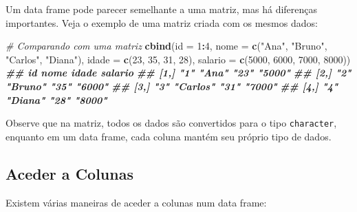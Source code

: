 \documentclass[
]{book}
\newenvironment{Shaded}{\begin{snugshade}}{\end{snugshade}}
\newcommand{\AttributeTok}[1]{\textcolor[rgb]{0.13,0.29,0.53}{#1}}
\newcommand{\CommentTok}[1]{\textcolor[rgb]{0.56,0.35,0.01}{\textit{#1}}}
\newcommand{\DecValTok}[1]{\textcolor[rgb]{0.00,0.00,0.81}{#1}}
\newcommand{\DocumentationTok}[1]{\textcolor[rgb]{0.56,0.35,0.01}{\textbf{\textit{#1}}}}
\newcommand{\FunctionTok}[1]{\textcolor[rgb]{0.13,0.29,0.53}{\textbf{#1}}}
\newcommand{\NormalTok}[1]{#1}
\newcommand{\SpecialCharTok}[1]{\textcolor[rgb]{0.81,0.36,0.00}{\textbf{#1}}}
\newcommand{\StringTok}[1]{\textcolor[rgb]{0.31,0.60,0.02}{#1}}
\begin{document}
Um data frame pode parecer semelhante a uma matriz, mas há diferenças
importantes. Veja o exemplo de uma matriz criada com os mesmos dados:

\begin{Shaded}
\begin{Highlighting}[]
\CommentTok{\# Comparando com uma matriz}
\FunctionTok{cbind}\NormalTok{(}\AttributeTok{id =} \DecValTok{1}\SpecialCharTok{:}\DecValTok{4}\NormalTok{,}
\AttributeTok{nome =} \FunctionTok{c}\NormalTok{(}\StringTok{"Ana"}\NormalTok{, }\StringTok{"Bruno"}\NormalTok{, }\StringTok{"Carlos"}\NormalTok{, }\StringTok{"Diana"}\NormalTok{),}
\AttributeTok{idade =} \FunctionTok{c}\NormalTok{(}\DecValTok{23}\NormalTok{, }\DecValTok{35}\NormalTok{, }\DecValTok{31}\NormalTok{, }\DecValTok{28}\NormalTok{),}
\AttributeTok{salario =} \FunctionTok{c}\NormalTok{(}\DecValTok{5000}\NormalTok{, }\DecValTok{6000}\NormalTok{, }\DecValTok{7000}\NormalTok{, }\DecValTok{8000}\NormalTok{))}
\DocumentationTok{\#\#      id  nome     idade salario}
\DocumentationTok{\#\# [1,] "1" "Ana"    "23"  "5000" }
\DocumentationTok{\#\# [2,] "2" "Bruno"  "35"  "6000" }
\DocumentationTok{\#\# [3,] "3" "Carlos" "31"  "7000" }
\DocumentationTok{\#\# [4,] "4" "Diana"  "28"  "8000"}
\end{Highlighting}
\end{Shaded}

Observe que na matriz, todos os dados são convertidos para o tipo
\texttt{character}, enquanto em um data frame, cada coluna mantém seu próprio
tipo de dados.

\subsection{Aceder a Colunas}\label{aceder-a-colunas}

Existem várias maneiras de aceder a colunas num data frame:
\end{document}
